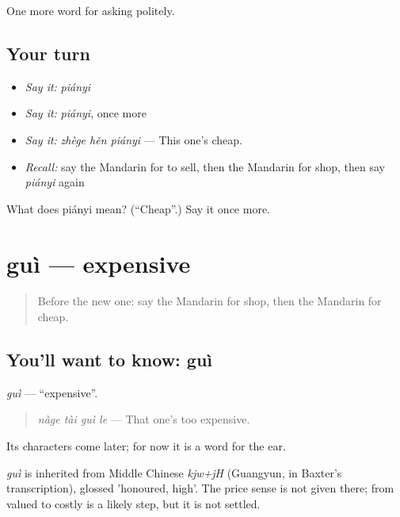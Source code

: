 \begin{grammarlens}[title={What you've built}]
One more word for asking politely.
\end{grammarlens}

\subsection*{Your turn}
\begin{itemize}
\raggedright
  \item \emph{Say it:} \emph{piányi}
  \item \emph{Say it:} \emph{piányi}, once more
  \item \emph{Say it:} \emph{zhège hěn piányi} — This one's cheap.
  \item \emph{Recall:} say the Mandarin for to sell, then the Mandarin for shop, then say \emph{piányi} again
\end{itemize}

\begin{tcolorbox}[breakable,colback=teal!4,colframe=teal!35!black,title={Before you move on}]
What does piányi mean? (\textquotedblleft{}Cheap\textquotedblright{}.) Say it once more.
\end{tcolorbox}
\section[guì]{guì — expensive}

\label{lesson:ZH-C42-gui}



\begin{quote}
Before the new one: say the Mandarin for shop, then the Mandarin for cheap.
\end{quote}

\subsection*{You'll want to know: guì}
\emph{guì} — \textquotedblleft{}expensive\textquotedblright{}.

\begin{quote}
\emph{nàge tài guì le} — That one's too expensive.
\end{quote}

Its characters come later; for now it is a word for the ear.

\begin{cousinweb}
\emph{guì} is inherited from Middle Chinese \emph{kjw+jH} (Guangyun, in Baxter's transcription), glossed 'honoured, high'. The price sense is not given there; from valued to costly is a likely step, but it is not settled.
\end{cousinweb}

